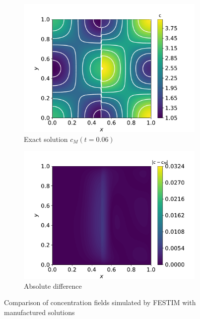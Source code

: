 \begin{figure}
\begin{subfigure}{0.33\linewidth}
        \includegraphics[width=\linewidth]{Figures/Chapter3/monoblocks/interface_condition/u_exact_t0.06.pdf}
        \caption{Exact solution $c_M(t=0.06)$}
    \end{subfigure}%
    \begin{subfigure}{0.33\linewidth}
        \centering
        \includegraphics[width=\linewidth]{Figures/Chapter3/monoblocks/interface_condition/diff_t0.06.pdf}
        \caption{Absolute difference}
    \end{subfigure}
    \caption{Comparison of concentration fields simulated by FESTIM with manufactured solutions}
    \label{fig: results MMS}
\end{figure}


